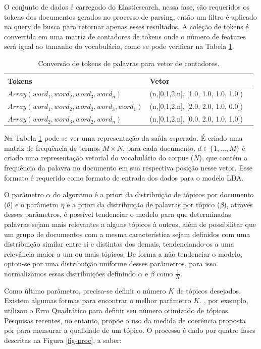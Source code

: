 \documentclass[12pt,a4paper]{article}
\begin{document}
O conjunto de dados é carregado do Elasticsearch, nessa fase, são requeridos os tokens dos documentos gerados no processo de parsing, então
 um filtro é aplicado na query de busca para retornar apenas esses resultados. A coleção de tokens é convertida em uma matriz de contadores de tokens onde o número de features será igual ao tamanho do vocabulário, como se pode verificar na Tabela \ref{tab-voc}.


\begin{table}[H]
  \centering
  \begin{tabular}{l l l}
  Tokens		&Vetor &\\
  \hline
  $Array(word_1, word_2, word_3, word_n)$						&(n,[0,1,2,n], [1.0, 1.0, 1.0, 1.0]) &\\
  $Array(word_1, word_2, word_2, word_3, word_1)$				&(n,[0,1,2,n], [2.0, 2.0, 1.0, 0.0]) &\\
  $Array(word_2, word_3, word_2, word_n)$						&(n,[0,1,2,n], [0.0, 2.0, 1.0, 1.0]) &\\
  \hline
  \end{tabular}
  
  \caption{Conversão de tokens de palavras para vetor de contadores.}
  \label{tab-voc}
\end{table}


Na Tabela \ref{tab-voc} pode-se ver uma representação da saída esperada. É criado uma matriz de frequência de termos $M \times N$, para cada documento,
 $d \in \{1,. . . , M\}$ é criado uma representação vetorial do vocabulário do corpus ($N$), que contém a frequência da palavra no documento em sua respectiva posição nesse vetor.
 Esse formato é requerido como formato de entrada dos dados para o modelo LDA.

O parâmetro $\alpha$ do algoritmo é a priori da distribuição de tópicos por documento ($\theta$) e o parâmetro $\eta$ é a priori da distribuição de palavras por tópico ($\beta$),
 através desses parâmetros, é possível tendenciar o modelo para que determinadas palavras sejam mais relevantes a alguns tópicos à outros,
 além de possibilitar que um grupo de documentos com a mesma característica sejam definidos com uma distribuição similar entre si e distintas dos demais,
 tendenciando-os a uma relevância maior a um ou mais tópicos. De forma a não tendenciar o modelo, optou-se por uma distribuição uniforme desses parâmetros,
 para isso normalizamos essas distribuições definindo $\alpha$ e $\beta$ como $\frac{1}{K}$.

Como último parâmetro, precisa-se definir o número $K$ de tópicos desejados. Existem algumas formas para encontrar o melhor parâmetro $K$.  , por exemplo, utilizou o Erro Quadrático para definir seu número otimizado de tópicos. Pesquisas recentes, no entanto,
 propõe o uso da medida de coerência proposta por  para mensurar a qualidade de um tópico. O processo é dado por quatro fases descritas na Figura \ref{fig-proc}, a saber:
\end{document}
